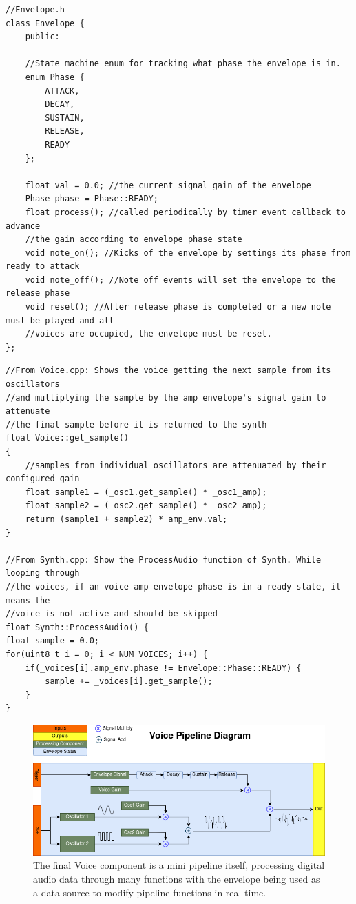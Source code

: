 \documentclass[acmlarge,screen]{acmart}
\begin{document}
	\begin{verbatim}
//Envelope.h
class Envelope {
	public:
	
	//State machine enum for tracking what phase the envelope is in.
	enum Phase {
		ATTACK,
		DECAY,
		SUSTAIN,
		RELEASE,
		READY 
	};
	
	float val = 0.0; //the current signal gain of the envelope
	Phase phase = Phase::READY;
	float process(); //called periodically by timer event callback to advance
	//the gain according to envelope phase state
	void note_on(); //Kicks of the envelope by settings its phase from ready to attack
	void note_off(); //Note off events will set the envelope to the release phase
	void reset(); //After release phase is completed or a new note must be played and all
	//voices are occupied, the envelope must be reset.
};
	\end{verbatim}
	
	\begin{verbatim}
//From Voice.cpp: Shows the voice getting the next sample from its oscillators
//and multiplying the sample by the amp envelope's signal gain to attenuate
//the final sample before it is returned to the synth
float Voice::get_sample()
{   
	//samples from individual oscillators are attenuated by their configured gain
	float sample1 = (_osc1.get_sample() * _osc1_amp);
	float sample2 = (_osc2.get_sample() * _osc2_amp);
	return (sample1 + sample2) * amp_env.val;
}

//From Synth.cpp: Show the ProcessAudio function of Synth. While looping through
//the voices, if an voice amp envelope phase is in a ready state, it means the 
//voice is not active and should be skipped
float Synth::ProcessAudio() {
float sample = 0.0;
for(uint8_t i = 0; i < NUM_VOICES; i++) {
	if(_voices[i].amp_env.phase != Envelope::Phase::READY) {
		sample += _voices[i].get_sample();
	}
}
	\end{verbatim}

	\begin{figure}[H]
		\includegraphics[width=\linewidth]{Voice_Pipeline_Diagram}
		\caption{The final Voice component is a mini pipeline itself, processing digital audio data through many functions with the envelope being used as a data source to modify pipeline functions in real time.}
		\centering
	\end{figure}
	
\end{document}
